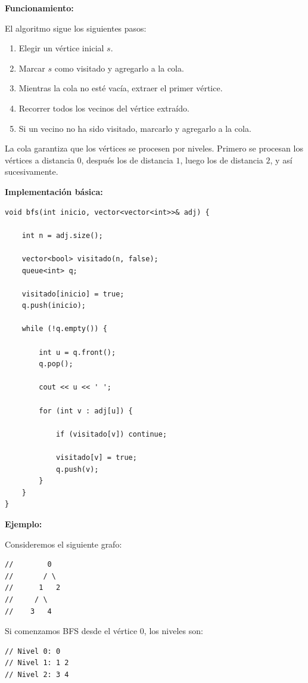 \documentclass[10pt,a4paper,twocolumn]{article}
\begin{document}
\textbf{Funcionamiento:}

El algoritmo sigue los siguientes pasos:

\begin{enumerate}
    \item Elegir un vértice inicial $s$.
    \item Marcar $s$ como visitado y agregarlo a la cola.
    \item Mientras la cola no esté vacía, extraer el primer vértice.
    \item Recorrer todos los vecinos del vértice extraído.
    \item Si un vecino no ha sido visitado, marcarlo y agregarlo a
    la cola.
\end{enumerate}

La cola garantiza que los vértices se procesen por niveles. Primero
se procesan los vértices a distancia $0$, después los de distancia
$1$, luego los de distancia $2$, y así sucesivamente.

\textbf{Implementación básica:}

\begin{lstlisting}[style=cpp]
void bfs(int inicio, vector<vector<int>>& adj) {

    int n = adj.size();

    vector<bool> visitado(n, false);
    queue<int> q;

    visitado[inicio] = true;
    q.push(inicio);

    while (!q.empty()) {

        int u = q.front();
        q.pop();

        cout << u << ' ';

        for (int v : adj[u]) {

            if (visitado[v]) continue;

            visitado[v] = true;
            q.push(v);
        }
    }
}
\end{lstlisting}

\textbf{Ejemplo:}

Consideremos el siguiente grafo:

\begin{lstlisting}[style=cpp]
//        0
//       / \
//      1   2
//     / \
//    3   4
\end{lstlisting}

Si comenzamos BFS desde el vértice $0$, los niveles son:

\begin{lstlisting}[style=cpp]
// Nivel 0: 0
// Nivel 1: 1 2
// Nivel 2: 3 4
\end{lstlisting}
\end{document}

